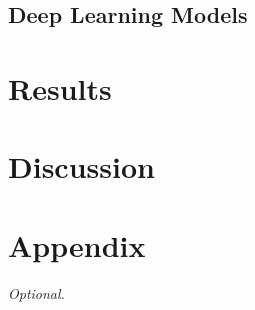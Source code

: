 \documentclass{article}
\begin{document}
\subsection{Deep Learning Models}

\answerTODO

\section{Results}

\answerTODO

\section{Discussion}

\answerTODO







\appendix

\section{Appendix}


\textit{Optional.}
\end{document}
